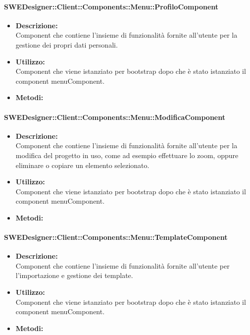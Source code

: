 			\paragraph{SWEDesigner::Client::Components::Menu::ProfiloComponent}
				\begin{itemize}
          			\item \textbf{Descrizione:}\\
          			Component che contiene l’insieme di funzionalità fornite all’utente per la gestione dei propri dati personali.
          			\item \textbf{Utilizzo:}\\
          			Component che viene istanziato per bootstrap dopo che è stato istanziato il component menuComponent.
          			\item \textbf{Metodi:}\\
          		\end{itemize}
			\paragraph{SWEDesigner::Client::Components::Menu::ModificaComponent}
				\begin{itemize}
          			\item \textbf{Descrizione:}\\
          			Component che contiene l’insieme di funzionalità fornite all’utente per la modifica del progetto in uso, come ad esempio effettuare lo zoom, oppure eliminare o copiare un elemento selezionato.
          			\item \textbf{Utilizzo:}\\
          			Component che viene istanziato per bootstrap dopo che è stato istanziato il component menuComponent.
          			\item \textbf{Metodi:}\\
          		\end{itemize}
          	\paragraph{SWEDesigner::Client::Components::Menu::TemplateComponent}
				\begin{itemize}
          			\item \textbf{Descrizione:}\\
          			Component che contiene l’insieme di funzionalità fornite all’utente per l’importazione e gestione dei template.
          			\item \textbf{Utilizzo:}\\
          			Component che viene istanziato per bootstrap dopo che è stato istanziato il component menuComponent.
          			\item \textbf{Metodi:}\\
          		\end{itemize}
